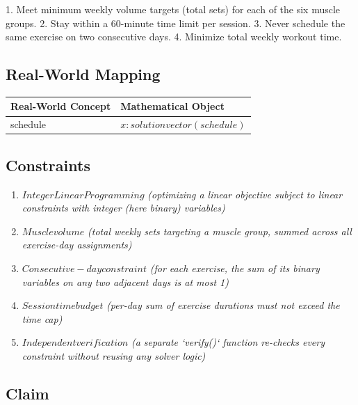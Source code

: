 \documentclass[11pt, a4paper]{article}
\begin{document}
1. Meet minimum weekly volume targets (total sets) for each of the six muscle groups.
2. Stay within a 60-minute time limit per session.
3. Never schedule the same exercise on two consecutive days.
4. Minimize total weekly workout time.

\subsection{Real-World Mapping}

\begin{longtable}{ll}
\toprule
\textbf{Real-World Concept} & \textbf{Mathematical Object} \\
\midrule
\endhead
schedule & $x: solution vector (schedule)$ \\
\bottomrule
\end{longtable}

\subsection{Constraints}

\begin{enumerate}
  \item $Integer Linear Programming$
  \hfill \textit{(optimizing a linear objective subject to linear constraints with integer (here binary) variables)}
  \item $Muscle volume$
  \hfill \textit{(total weekly sets targeting a muscle group, summed across all exercise-day assignments)}
  \item $Consecutive-day constraint$
  \hfill \textit{(for each exercise, the sum of its binary variables on any two adjacent days is at most 1)}
  \item $Session time budget$
  \hfill \textit{(per-day sum of exercise durations must not exceed the time cap)}
  \item $Independent verification$
  \hfill \textit{(a separate `verify()` function re-checks every constraint without reusing any solver logic)}
\end{enumerate}

\subsection{Claim}
\end{document}
